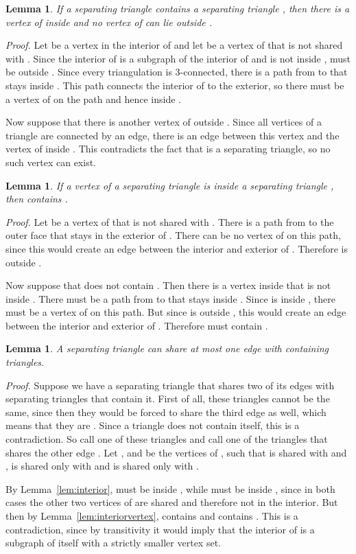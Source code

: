 \pdfoutput=1 \documentclass[12pt]{elsarticle}
\newtheorem{lem}[defin]{Lemma}
\newenvironment{lemma}{\begin{lem} \sl}{\end{lem}}
\newenvironment{proof}{\emph{Proof.}}{\hfill  \medskip\\}
\begin{document}
\begin{lemma}
 \label{lem:interior}
 If a separating triangle  contains a separating triangle , then there is a vertex of  inside  and no vertex of  can lie outside .
\end{lemma}
\begin{proof}
 Let  be a vertex in the interior of  and let  be a vertex of  that is not shared with . Since the interior of  is a subgraph of the interior of  and  is not inside ,  must be outside . Since every triangulation is 3-connected, there is a path from  to  that stays inside . This path connects the interior of  to the exterior, so there must be a vertex of  on the path and hence inside .
 
 Now suppose that there is another vertex of  outside . Since all vertices of a triangle are connected by an edge, there is an edge between this vertex and the vertex of  inside . This contradicts the fact that  is a separating triangle, so no such vertex can exist.
\end{proof}
\vspace{-0.5em}
\begin{lemma}
 \label{lem:interiorvertex}
 If a vertex  of a separating triangle  is inside a separating triangle , then  contains .
\end{lemma}
\begin{proof}
 Let  be a vertex of  that is not shared with . There is a path from  to the outer face that stays in the exterior of . There can be no vertex of  on this path, since this would create an edge between the interior and exterior of . Therefore  is outside .
 
 Now suppose that  does not contain . Then there is a vertex  inside  that is not inside . There must be a path from  to  that stays inside . Since  is inside , there must be a vertex of  on this path. But since  is outside , this would create an edge between the interior and exterior of . Therefore  must contain .
\end{proof}
\vspace{-0.5em}
\begin{lemma}
 \label{lem:onecontainingtriangle}
 A separating triangle can share at most one edge with containing triangles.
\end{lemma}
\begin{proof}
 Suppose we have a separating triangle  that shares two of its edges with separating triangles that contain it. First of all, these triangles cannot be the same, since then they would be forced to share the third edge as well, which means that they are . Since a triangle does not contain itself, this is a contradiction. So call one of these triangles  and call one of the triangles that shares the other edge . Let ,  and  be the vertices of , such that  is shared with  and ,  is shared only with  and  is shared only with .

 By Lemma~\ref{lem:interior},  must be inside , while  must be inside , since in both cases the other two vertices of  are shared and therefore not in the interior. But then by Lemma~\ref{lem:interiorvertex},  contains  and  contains . This is a contradiction, since by transitivity it would imply that the interior of  is a subgraph of itself with a strictly smaller vertex set.
\end{proof}
\end{document}
